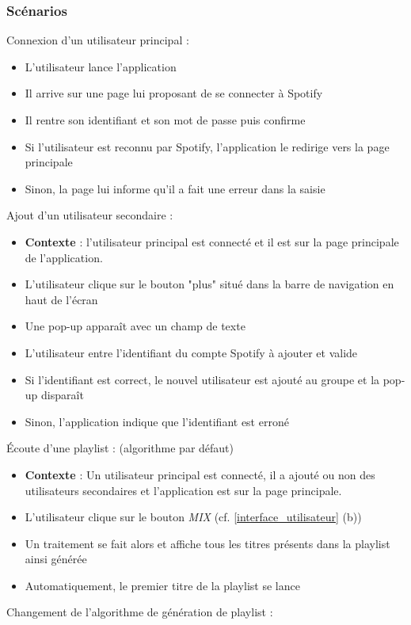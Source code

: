 \documentclass{article}
\begin{document}
		\subsubsection{Scénarios}
		Connexion d'un utilisateur principal :
		\begin{itemize}
			\item L'utilisateur lance l'application
			\item Il arrive sur une page lui proposant de se connecter à Spotify
			\item Il rentre son identifiant et son mot de passe puis confirme
			\item Si l'utilisateur est reconnu par Spotify, l'application le redirige vers la page principale
			\item Sinon, la page lui informe qu'il a fait une erreur dans la saisie
		\end{itemize}
		Ajout d'un utilisateur secondaire :
		\begin{itemize}
			\item[] \textbf{Contexte} : l'utilisateur principal est connecté et il est sur la page principale de l'application.
			\item L'utilisateur clique sur le bouton "plus" situé dans la barre de navigation en haut de l'écran
			\item Une pop-up apparaît avec un champ de texte
			\item L'utilisateur entre l'identifiant du compte Spotify à ajouter et valide
			\item Si l'identifiant est correct, le nouvel utilisateur est ajouté au groupe et la pop-up disparaît
			\item Sinon, l'application indique que l'identifiant est erroné
		\end{itemize}
		\newpage
		Écoute d'une playlist : (algorithme par défaut)
		\begin{itemize}
			\item[] \textbf{Contexte} : Un utilisateur principal est connecté, il a ajouté ou non des utilisateurs secondaires et l'application est sur la page principale.
			\item L'utilisateur clique sur le bouton \textit{MIX} (cf. \ref{interface_utilisateur} (b))
			\item Un traitement se fait alors et affiche tous les titres présents dans la playlist ainsi générée
			\item Automatiquement, le premier titre de la playlist se lance
		\end{itemize}
		Changement de l'algorithme de génération de playlist :
\end{document}
